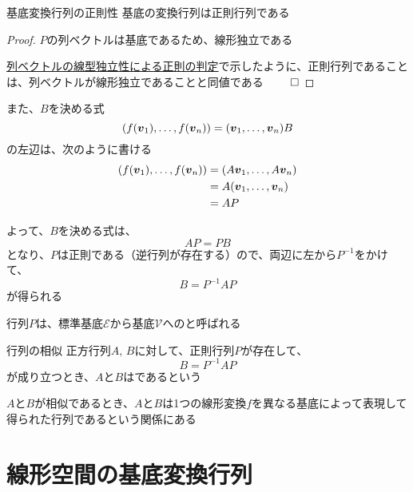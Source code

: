 \documentclass[../../../topic_linear-algebra]{subfiles}
\begin{document}
\begin{theorem}{基底変換行列の正則性}
  基底の変換行列は正則行列である
\end{theorem}

\begin{proof}
  $P$の列ベクトルは基底であるため、線形独立である

  \hyperref[thm:invertible-iff-col-indep]{列ベクトルの線型独立性による正則の判定}で示したように、正則行列であることは、列ベクトルが線形独立であることと同値である $\qed$
\end{proof}

また、$B$を決める式
\begin{equation*}
  (f(\vb*{v}_1), \ldots, f(\vb*{v}_n)) = (\vb*{v}_1, \ldots, \vb*{v}_n) B
\end{equation*}
の左辺は、次のように書ける
\begin{align*}
  (f(\vb*{v}_1), \ldots, f(\vb*{v}_n)) & = (A\vb*{v}_1, \ldots, A\vb*{v}_n) \\
                                       & = A (\vb*{v}_1, \ldots, \vb*{v}_n) \\
                                       & = A P
\end{align*}

よって、$B$を決める式は、
\begin{equation*}
  AP = PB
\end{equation*}
となり、$P$は正則である（逆行列が存在する）ので、両辺に左から$P^{-1}$をかけて、
\begin{equation*}
  B = P^{-1} A P
\end{equation*}
が得られる

\br

行列$P$は、標準基底$\mathcal{E}$から基底$\mathcal{V}$へのと呼ばれる

\sectionline

\begin{definition}{行列の相似}
  正方行列$A,\,B$に対して、正則行列$P$が存在して、
  \begin{equation*}
    B = P^{-1} A P
  \end{equation*}
  が成り立つとき、$A$と$B$はであるという
\end{definition}

$A$と$B$が相似であるとき、$A$と$B$は1つの線形変換$f$を異なる基底によって表現して得られた行列であるという関係にある

\sectionline
\section{線形空間の基底変換行列}
\end{document}
